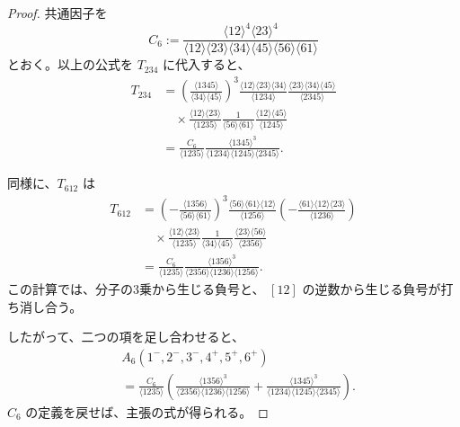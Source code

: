 \documentclass[uplatex,dvipdfmx,a4paper,11pt]{jsarticle}
\renewcommand{\proofname}{Proof}
\newenvironment{myproof}[1][\proofname]
  {\begin{proof}[#1]}
  {\end{proof}}
\numberwithin{equation}{section}
\begin{document}
\begin{myproof}
  共通因子を
  \[
    C_6:=
    \frac{
      \langle12\rangle^4\langle23\rangle^4
    }{
      \langle12\rangle\langle23\rangle
      \langle34\rangle\langle45\rangle
      \langle56\rangle\langle61\rangle
    }
  \]
  とおく。以上の公式を $T_{234}$ に代入すると、
  \[
    \begin{aligned}
      T_{234}
      &=
      \left(
        \frac{\langle1345\rangle}{
          \langle34\rangle\langle45\rangle
        }
      \right)^3
      \frac{
        \langle12\rangle\langle23\rangle\langle34\rangle
      }{\langle1234\rangle}
      \frac{
        \langle23\rangle\langle34\rangle\langle45\rangle
      }{\langle2345\rangle}\\
      &\quad\times
      \frac{\langle12\rangle\langle23\rangle}
           {\langle1235\rangle}
      \frac{1}{\langle56\rangle\langle61\rangle}
      \frac{\langle12\rangle\langle45\rangle}
           {\langle1245\rangle}\\
      &=
      \frac{C_6}{\langle1235\rangle}
      \frac{\langle1345\rangle^3}{
        \langle1234\rangle
        \langle1245\rangle
        \langle2345\rangle
      }.
    \end{aligned}
  \]

  同様に、$T_{612}$ は
  \[
    \begin{aligned}
      T_{612}
      &=
      \left(
        -\frac{\langle1356\rangle}{
          \langle56\rangle\langle61\rangle
        }
      \right)^3
      \frac{
        \langle56\rangle\langle61\rangle\langle12\rangle
      }{\langle1256\rangle}
      \left(
        -\frac{
          \langle61\rangle\langle12\rangle\langle23\rangle
        }{\langle1236\rangle}
      \right)\\
      &\quad\times
      \frac{\langle12\rangle\langle23\rangle}
           {\langle1235\rangle}
      \frac{1}{\langle34\rangle\langle45\rangle}
      \frac{\langle23\rangle\langle56\rangle}
           {\langle2356\rangle}\\
      &=
      \frac{C_6}{\langle1235\rangle}
      \frac{\langle1356\rangle^3}{
        \langle2356\rangle
        \langle1236\rangle
        \langle1256\rangle
      }.
    \end{aligned}
  \]
  この計算では、分子の3乗から生じる負号と、
  $[12]$ の逆数から生じる負号が打ち消し合う。

  したがって、二つの項を足し合わせると、
  \[
    \begin{aligned}
      &A_6(1^-,2^-,3^-,4^+,5^+,6^+)\\
      &=
      \frac{C_6}{\langle1235\rangle}
      \left(
        \frac{\langle1356\rangle^3}{
          \langle2356\rangle
          \langle1236\rangle
          \langle1256\rangle
        }
        +
        \frac{\langle1345\rangle^3}{
          \langle1234\rangle
          \langle1245\rangle
          \langle2345\rangle
        }
      \right).
    \end{aligned}
  \]
  $C_6$ の定義を戻せば、主張の式が得られる。
\end{myproof}
\end{document}
